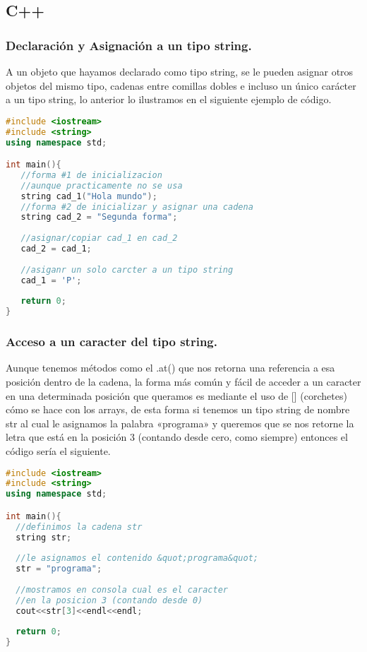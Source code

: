 \subsection{C++}

\subsubsection{Declaración y Asignación a un tipo string.}
A un objeto que hayamos declarado como tipo string, se le pueden asignar otros objetos del mismo tipo, cadenas entre comillas dobles e incluso un único carácter a un tipo string, lo anterior lo ilustramos en el siguiente ejemplo de código.

\begin{lstlisting}[language=C++]
#include <iostream>
#include <string>
using namespace std;

int main(){
   //forma #1 de inicializacion
   //aunque practicamente no se usa
   string cad_1("Hola mundo");
   //forma #2 de inicializar y asignar una cadena
   string cad_2 = "Segunda forma";
	
   //asignar/copiar cad_1 en cad_2
   cad_2 = cad_1;
	
   //asiganr un solo carcter a un tipo string
   cad_1 = 'P';
	
   return 0;
}
\end{lstlisting} 

\subsubsection{Acceso a un caracter del tipo string.}
Aunque tenemos métodos como el .at() que nos retorna una referencia a esa posición dentro de la cadena, la forma más común y fácil de acceder a un caracter en una determinada posición que queramos es mediante el uso de [] (corchetes) cómo se hace con los arrays, de esta forma si tenemos un tipo string de nombre str al cual le asignamos la palabra «programa» y queremos que se nos retorne la letra que está en la posición 3 (contando desde cero, como siempre) entonces el código sería el siguiente.

\begin{lstlisting}[language=C++]
#include <iostream>
#include <string>
using namespace std;

int main(){
  //definimos la cadena str
  string str;
	
  //le asignamos el contenido &quot;programa&quot;
  str = "programa";
	
  //mostramos en consola cual es el caracter
  //en la posicion 3 (contando desde 0)
  cout<<str[3]<<endl<<endl;
	
  return 0;
}
\end{lstlisting}

